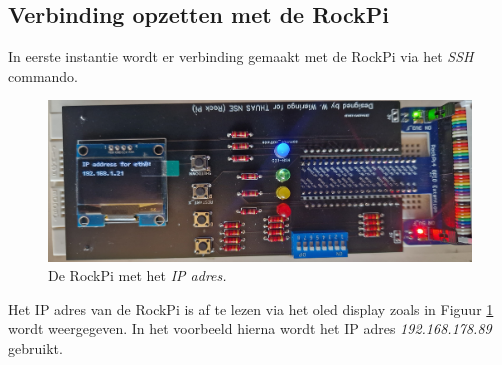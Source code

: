 \hypertarget{chp:ssh}{}
\subsection{Verbinding opzetten met de RockPi}\label{chp:contactPi}

In eerste instantie wordt er verbinding gemaakt met de RockPi via het \textit{SSH} commando.
\begin{figure}[h!]
	\centering
	\begin{center} 	
		\includegraphics[width=1\textwidth]{figuren/rockIPnr}
		\caption{De RockPi met het \textit{IP adres.}}
		\label{fig:rockpiip}   
	\end{center}
\end{figure}
 Het IP adres van de RockPi is af te lezen via het oled display zoals in Figuur \ref{fig:rockpiip} wordt weergegeven. In het voorbeeld hierna wordt het IP adres \textit{192.168.178.89} gebruikt.


